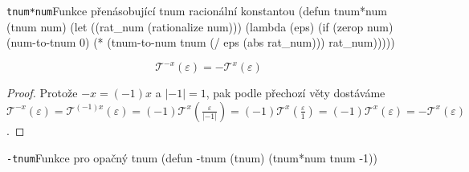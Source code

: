\begin{lispcode}{\texttt{tnum*num}}{Funkce přenásobující tnum racionální konstantou}
(\textcolor{funkcionalni}{defun} \textcolor{pojmenovan}{tnum*num} (tnum num)
  (\textcolor{vedlejsi}{let} ((rat_num (\textcolor{matematicke}{rationalize} num)))
    (\textcolor{funkcionalni}{lambda} (eps)
      (\textcolor{funkcionalni}{if} (\textcolor{funkcionalni}{zerop} num)
        (\textcolor{moje}{num-to-tnum} 0)
        (\textcolor{matematicke}{*} (\textcolor{moje}{tnum-to-num} tnum (\textcolor{matematicke}{/} eps (\textcolor{matematicke}{abs} rat_num))) rat_num)))))
\end{lispcode}

\begin{consequence}\label{dusl:negace_tnumu}
\begin{equation}
\mathcal{T}^{-x}(\varepsilon)=-\mathcal{T}^x(\varepsilon)
\end{equation}
\begin{proof}
Protože $-x = (-1)x$ a $|-1|=1$, pak podle přechozí věty dostáváme $\mathcal{T}^{-x}(\varepsilon) = \mathcal{T}^{(-1)x}(\varepsilon)=(-1)\mathcal{T}^{x}(\frac{\varepsilon}{|-1|})=(-1)\mathcal{T}^{x}(\frac{\varepsilon}{1})=(-1)\mathcal{T}^{x}(\varepsilon)=-\mathcal{T}^{x}(\varepsilon)$.
\end{proof}
\end{consequence}

\begin{lispcode}{\texttt{-tnum}}{Funkce pro opačný tnum}
(\textcolor{funkcionalni}{defun} \textcolor{pojmenovan}{-tnum} (tnum)
  (\textcolor{moje}{tnum*num} tnum -1))
\end{lispcode}

